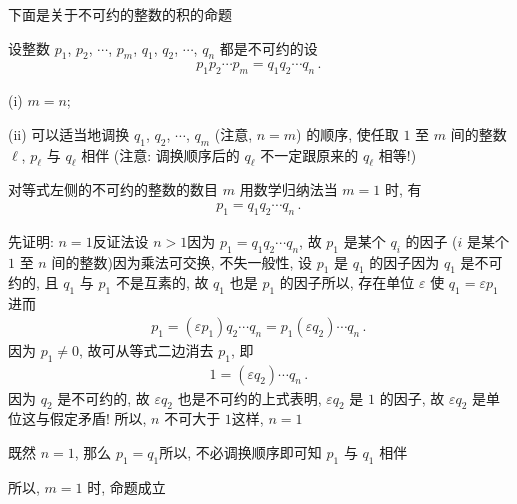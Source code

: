 下面是关于不可约的整数的积的命题\period

\begin{proposition}
    设整数 $p_1$, $p_2$, $\cdots$, $p_m$, $q_1$, $q_2$, $\cdots$, $q_n$ 都是不可约的\period 设
    \begin{align*}
        p_1 p_2 \cdots p_m = q_1 q_2 \cdots q_n \period
    \end{align*}

    (i) $m = n$;

    (ii) 可以适当地调换 $q_1$, $q_2$, $\cdots$, $q_m$ (注意, $n = m$) 的顺序, 使任取 $1$ 至 $m$ 间的整数 $\ell$, $p_{\ell}$ 与 $q_{\ell}$ 相伴 (注意: 调换顺序后的 $q_{\ell}$ 不一定跟原来的 $q_{\ell}$ 相等!)\period
\end{proposition}

\begin{pf}
    对等式左侧的不可约的整数的数目 $m$ 用数学归纳法\period 当 $m = 1$ 时, 有
    \begin{align*}
        p_1 = q_1 q_2 \cdots q_n \period
    \end{align*}

    先证明: $n = 1$\period 反证法\period 设 $n > 1$\period 因为 $p_1 = q_1 q_2 \cdots q_n$, 故 $p_1$ 是某个 $q_i$ 的因子 ($i$ 是某个 $1$ 至 $n$ 间的整数)\period 因为乘法可交换, 不失一般性, 设 $p_1$ 是 $q_1$ 的因子\period 因为 $q_1$ 是不可约的, 且 $q_1$ 与 $p_1$ 不是互素的, 故 $q_1$ 也是 $p_1$ 的因子\period 所以, 存在单位 $\varepsilon$ 使 $q_1 = \varepsilon p_1$\period 进而
    \begin{align*}
        p_1 = (\varepsilon p_1) q_2 \cdots q_n = p_1 (\varepsilon q_2) \cdots q_n \period
    \end{align*}
    因为 $p_1 \neq 0$, 故可从等式二边消去 $p_1$, 即
    \begin{align*}
        1 = (\varepsilon q_2) \cdots q_n \period
    \end{align*}
    因为 $q_2$ 是不可约的, 故 $\varepsilon q_2$ 也是不可约的\period 上式表明, $\varepsilon q_2$ 是 $1$ 的因子, 故 $\varepsilon q_2$ 是单位\period 这与假定矛盾! 所以, $n$ 不可大于 $1$\period 这样, $n = 1$\period

    既然 $n = 1$, 那么 $p_1 = q_1$\period 所以, 不必调换顺序即可知 $p_1$ 与 $q_1$ 相伴\period

    所以, $m=1$ 时, 命题成立\period


\end{pf}
